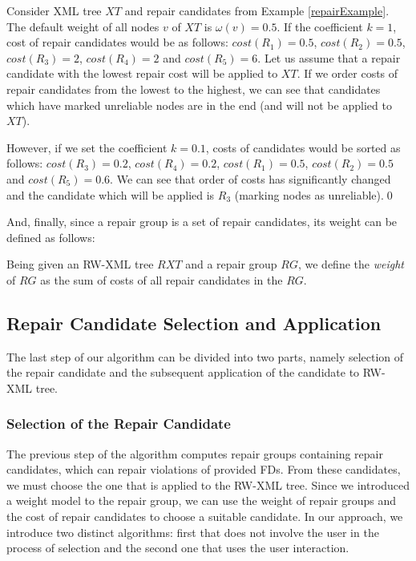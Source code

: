 \begin{example}\label{koefK}
Consider XML tree $XT$ and repair candidates from Example \ref{repairExample}. The default weight of all nodes $v$ of $XT$ is $\omega(v) = 0.5$. If the coefficient $k = 1$, cost of repair candidates would be as follows: $cost(R_1) = 0.5$, $cost(R_2) = 0.5$, $cost(R_3) = 2$, $cost(R_4) = 2$ and $cost(R_5) = 6$.
Let us assume that a repair candidate with the lowest repair cost will be applied to $XT$. If we order costs of repair candidates from the lowest to the highest, we can see that candidates which have marked unreliable nodes are in the end (and will not be applied to $XT$).

However, if we set the coefficient $k = 0.1$, costs of candidates would be sorted as follows: $cost(R_3) = 0.2$, $cost(R_4) = 0.2$, $cost(R_1) = 0.5$, $cost(R_2)  = 0.5$ and $cost(R_5) = 0.6$. We can see that order of costs has significantly changed and the candidate which will be applied is $R_3$ (marking nodes as unreliable).\qed
\end{example}

And, finally, since a repair group is a set of repair candidates, its weight can be defined as follows:

\begin{define}
Being given an RW-XML tree $RXT$ and a repair group $RG$, we define the {\sl weight} of $RG$ as the sum of costs of all repair candidates in the $RG$.
\end{define}

\subsection{Repair Candidate Selection and Application}

The last step of our algorithm can be divided into two parts, namely selection of the repair candidate and the subsequent application of the candidate to RW-XML tree.

\subsubsection{Selection of the Repair Candidate}

The previous step of the algorithm computes repair groups containing repair candidates, which can repair violations of provided FDs. From these candidates, we must choose the one that is applied to the RW-XML tree. Since we introduced a weight model to the repair group, we can use the weight of repair groups and the cost of repair candidates to choose a suitable candidate. In our approach, we introduce two distinct algorithms: first that does not involve the user in the process of selection and the second one that uses the user interaction.

